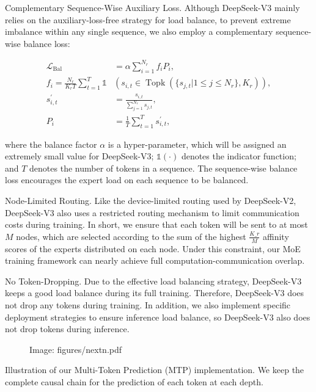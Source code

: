 \documentclass[11pt,a4paper]{article}
\begin{document}
Complementary Sequence-Wise Auxiliary Loss.
Although DeepSeek-V3 mainly relies on the auxiliary-loss-free strategy for load balance, to prevent extreme imbalance within any single sequence, we also employ a complementary sequence-wise balance loss:

$$\begin{align}
    \mathcal{L}_{\mathrm{Bal}} & = \alpha \sum_{i=1}^{N_r}{f_i P_i}, \\
    f_i = \frac{N_r}{K_r T} \sum_{t=1}^{T} \mathds{1} & \left( s_{i,t} \in \operatorname{Topk} ( \{ s_{j, t} | 1 \leq j \leq N_r \}, K_{r} ) \right), \\
    s^{\prime}_{i,t} & = \frac{s_{i,t}}{\sum_{j=1}^{N_r} s_{j,t}}, \\
    P_i & = \frac{1}{T} \sum_{t=1}^{T}{s^{\prime}_{i,t}},
\end{align}$$

where the balance factor $\alpha$ is a hyper-parameter, which will be assigned an extremely small value for DeepSeek-V3; 
$\mathds{1}(\cdot)$ denotes the indicator function; 
and $T$ denotes the number of tokens in a sequence. 
The sequence-wise balance loss encourages the expert load on each sequence to be balanced.

Node-Limited Routing.
Like the device-limited routing used by DeepSeek-V2, DeepSeek-V3 also uses a restricted routing mechanism to limit communication costs during training. 
In short, we ensure that each token will be sent to at most $M$ nodes, which are selected according to the sum of the highest $\frac{K\_r}{M}$ affinity scores of the experts distributed on each node.
Under this constraint, our MoE training framework can nearly achieve full computation-communication overlap.

No Token-Dropping.
Due to the effective load balancing strategy, DeepSeek-V3 keeps a good load balance during its full training. 
Therefore, DeepSeek-V3 does not drop any tokens during training. 
In addition, we also implement specific deployment strategies to ensure inference load balance, so DeepSeek-V3 also does not drop tokens during inference.

\begin{figure}[h]
\caption{Image: figures/nextn.pdf}
\end{figure}

Illustration of our Multi-Token Prediction (MTP) implementation. 
 We keep the complete causal chain for the prediction of each token at each depth.
\end{document}
